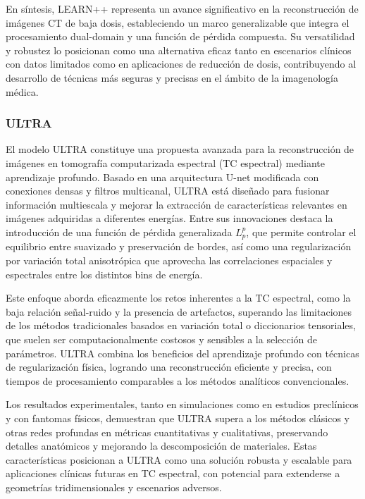 En síntesis, LEARN++ representa un avance significativo en la reconstrucción de imágenes CT de baja dosis, estableciendo un marco generalizable que integra el procesamiento dual-domain y una función de pérdida compuesta. Su versatilidad y robustez lo posicionan como una alternativa eficaz tanto en escenarios clínicos con datos limitados como en aplicaciones de reducción de dosis, contribuyendo al desarrollo de técnicas más seguras y precisas en el ámbito de la imagenología médica.

\subsubsection{ULTRA}

El modelo ULTRA \cite{ULTRA} constituye una propuesta avanzada para la reconstrucción de imágenes en tomografía computarizada espectral (TC espectral) mediante aprendizaje profundo. Basado en una arquitectura U-net modificada con conexiones densas y filtros multicanal, ULTRA está diseñado para fusionar información multiescala y mejorar la extracción de características relevantes en imágenes adquiridas a diferentes energías. Entre sus innovaciones destaca la introducción de una función de pérdida generalizada $ L_p^p $, que permite controlar el equilibrio entre suavizado y preservación de bordes, así como una regularización por variación total anisotrópica que aprovecha las correlaciones espaciales y espectrales entre los distintos bins de energía.

Este enfoque aborda eficazmente los retos inherentes a la TC espectral, como la baja relación señal-ruido y la presencia de artefactos, superando las limitaciones de los métodos tradicionales basados en variación total o diccionarios tensoriales, que suelen ser computacionalmente costosos y sensibles a la selección de parámetros. ULTRA combina los beneficios del aprendizaje profundo con técnicas de regularización física, logrando una reconstrucción eficiente y precisa, con tiempos de procesamiento comparables a los métodos analíticos convencionales.

Los resultados experimentales, tanto en simulaciones como en estudios preclínicos y con fantomas físicos, demuestran que ULTRA supera a los métodos clásicos y otras redes profundas en métricas cuantitativas y cualitativas, preservando detalles anatómicos y mejorando la descomposición de materiales. Estas características posicionan a ULTRA como una solución robusta y escalable para aplicaciones clínicas futuras en TC espectral, con potencial para extenderse a geometrías tridimensionales y escenarios adversos.

